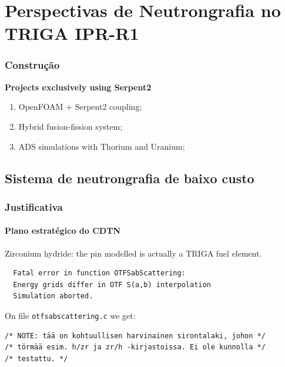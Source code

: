 \documentclass[svgnames,smaller,table]{beamer}
\begin{document}
\section{Perspectivas de Neutrongrafia no TRIGA IPR-R1}
\begin{frame}
  \frametitle{Construção}
  \textbf{Projects exclusively using Serpent2}
  \vspace{10px}
  \begin{enumerate}
    \item OpenFOAM + Serpent2 coupling\cite{Antonella2002};
    \item Hybrid fusion-fission system\cite{Antonella2003};
    \item ADS simulations with Thorium and Uranium\cite{Wilson2017};
    \end{enumerate}
\end{frame}


\subsection{Sistema de neutrongrafia de baixo custo}
\begin{frame}[fragile] %
  \frametitle{Justificativa}
  \framesubtitle{Plano estratégico do CDTN}
  \begin{center}
  Zirconium hydride: the pin modelled is actually a TRIGA fuel element.\\
\begin{verbatim}
  Fatal error in function OTFSabScattering:
  Energy grids differ in OTF S(a,b) interpolation
  Simulation aborted.
\end{verbatim}

On file \texttt{otfsabscattering.c} we get:

\begin{verbatim}
/* NOTE: tää on kohtuullisen harvinainen sirontalaki, johon */
/* törmää esim. h/zr ja zr/h -kirjastoissa. Ei ole kunnolla */
/* testattu. */
\end{verbatim}
  
  \end{center}
\end{frame}
\end{document}
